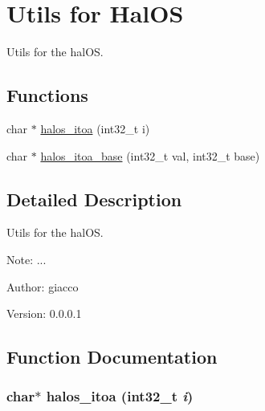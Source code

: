 \hypertarget{group___u_t_i_l_i_t_y_s}{
\section{Utils for HalOS}
\label{group___u_t_i_l_i_t_y_s}
}
Utils for the halOS.  


\subsection*{Functions}
\begin{CompactItemize}
\item 
char $\ast$ \hyperlink{group___u_t_i_l_i_t_y_s_g39795a495bf6886a2afe876815d69c88}{halos\_\-itoa} (int32\_\-t i)
\item 
char $\ast$ \hyperlink{group___u_t_i_l_i_t_y_s_gb12af2d83412a582fc6ee7805cd64e94}{halos\_\-itoa\_\-base} (int32\_\-t val, int32\_\-t base)
\end{CompactItemize}


\subsection{Detailed Description}
Utils for the halOS. 

\begin{Desc}
\item[Note:]... \end{Desc}
\begin{Desc}
\item[Author:]giacco \end{Desc}
\begin{Desc}
\item[Version:]0.0.0.1 \end{Desc}


\subsection{Function Documentation}
\hypertarget{group___u_t_i_l_i_t_y_s_g39795a495bf6886a2afe876815d69c88}{
\subsubsection[{halos\_\-itoa}]{\setlength{\rightskip}{0pt plus 5cm}char$\ast$ halos\_\-itoa (int32\_\-t {\em i})}}
\label{group___u_t_i_l_i_t_y_s_g39795a495bf6886a2afe876815d69c88}


